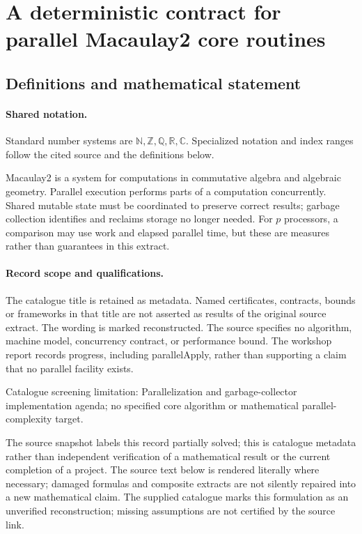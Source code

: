 \documentclass[11pt]{article}
\begin{document}
\section{A deterministic contract for parallel Macaulay2 core routines}\label{statement}

\subsection{Definitions and mathematical statement}

\paragraph{Shared notation.}Standard number systems are $\mathbb N,\mathbb Z,\mathbb Q,\mathbb R,\mathbb C$. Specialized notation and index ranges follow the cited source and the definitions below.


Macaulay2 is a system for computations in commutative algebra and algebraic geometry. Parallel execution performs parts of a computation concurrently. Shared mutable state must be coordinated to preserve correct results; garbage collection identifies and reclaims storage no longer needed. For $p$ processors, a comparison may use work and elapsed parallel time, but these are measures rather than guarantees in this extract.
\paragraph{Record scope and qualifications.}
The catalogue title is retained as metadata. Named certificates, contracts, bounds or frameworks in that title are not asserted as results of the original source extract.
The wording is marked reconstructed. The source specifies no algorithm, machine model, concurrency contract, or performance bound. The workshop report records progress, including parallelApply, rather than supporting a claim that no parallel facility exists.

Catalogue screening limitation: Parallelization and garbage-collector implementation agenda; no specified core algorithm or mathematical parallel-complexity target.

The source snapshot labels this record partially solved; this is catalogue metadata rather than independent verification of a mathematical result or the current completion of a project.
The source text below is rendered literally where necessary; damaged formulas and composite extracts are not silently repaired into a new mathematical claim.
The supplied catalogue marks this formulation as an unverified reconstruction; missing assumptions are not certified by the source link.
\end{document}
